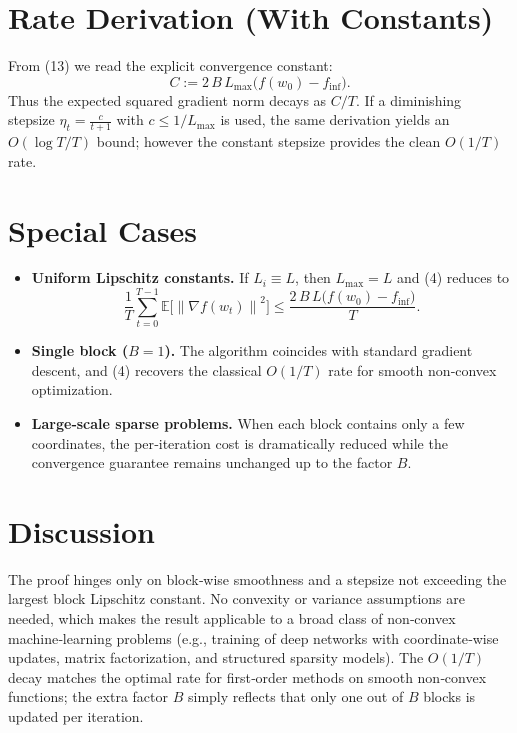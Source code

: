 \documentclass{article}
\newcommand{\E}{\mathbb{E}}
\newcommand{\norm}[1]{\left\|#1\right\|}
\newcommand{\grad}{\nabla}
\begin{document}
\section*{Rate Derivation (With Constants)}
From (13) we read the explicit convergence constant:
\[
C:=2\,B\,L_{\max}\bigl(f(w_0)-f_{\inf}\bigr).
\]
Thus the expected squared gradient norm decays as $C/T$.
If a diminishing stepsize $\eta_t=\frac{c}{t+1}$ with $c\le 1/L_{\max}$ is used,
the same derivation yields an $O(\log T/T)$ bound; however the constant
stepsize provides the clean $O(1/T)$ rate.

\section*{Special Cases}
\begin{itemize}
\item \textbf{Uniform Lipschitz constants.} If $L_i\equiv L$, then $L_{\max}=L$ and (4) reduces to
\[
\frac1T\sum_{t=0}^{T-1}\E\!\bigl[\norm{\grad f(w_t)}^{2}\bigr]\le
\frac{2\,B\,L\bigl(f(w_0)-f_{\inf}\bigr)}{T}.
\]
\item \textbf{Single block ($B=1$).} The algorithm coincides with standard gradient descent,
and (4) recovers the classical $O(1/T)$ rate for smooth non‑convex optimization.
\item \textbf{Large‑scale sparse problems.} When each block contains only a few coordinates,
the per‑iteration cost is dramatically reduced while the convergence guarantee remains unchanged up to the factor $B$.
\end{itemize}

\section*{Discussion}
The proof hinges only on block‑wise smoothness and a stepsize not exceeding the
largest block Lipschitz constant.  No convexity or variance assumptions are needed,
which makes the result applicable to a broad class of non‑convex machine‑learning
problems (e.g., training of deep networks with coordinate‑wise updates, matrix factorization,
and structured sparsity models).  The $O(1/T)$ decay matches the optimal rate for
first‑order methods on smooth non‑convex functions; the extra factor $B$ simply
reflects that only one out of $B$ blocks is updated per iteration.
\end{document}
